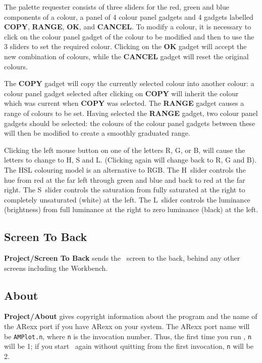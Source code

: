 The palette requester consists of three sliders for the red, green and blue 
components of a colour, a panel of 4 colour panel gadgets and 4 gadgets labelled 
{\bf COPY}, {\bf RANGE}, {\bf OK}, and {\bf CANCEL}. To modify a colour, it is 
necessary to click on 
the colour panel gadget of the colour to be modified and then to use the 3 sliders 
to set the required colour. Clicking on the {\bf OK} gadget will accept the new 
combination of colours, while the {\bf CANCEL} gadget will reset the original colours.

The {\bf COPY} gadget  will copy the currently selected colour into another colour: a 
colour panel gadget selected after clicking on {\bf COPY} will inherit the 
colour which was current when {\bf COPY} was selected. The {\bf RANGE} gadget 
causes a range of colours to be set. Having selected the {\bf RANGE} gadget, 
two colour panel gadgets should be 
selected: the colours of the colour panel gadgets between these will then be 
modified to create a smoothly graduated range.

Clicking the left mouse button on one of the letters R, G, or B, will cause the 
letters to change to H, S and L. (Clicking again will change back to R, G and B). 
The HSL colouring model is an alternative to RGB. The H~slider controls the hue from 
red at the far left through green and blue and back to red at the far right. The 
S~slider controls the saturation from fully saturated at the right to completely 
unsaturated (white) at the left. The L~slider controls the luminance (brightness) 
from full luminance at the right to zero luminance (black) at the left.

\subsection{Screen To Back}
{\bf Project/Screen To Back} sends the \amplot\ screen to the back, behind any other 
screens including the Workbench.

\subsection{About}
{\bf Project/About} gives copyright information about the program and the name of the 
ARexx port if you have ARexx on your system. The ARexx port name will 
be {\tt AMPlot.n}, where {\tt n} is the invocation number. Thus, the first time 
you run \amplot, {\tt n} will be 1; if you start \amplot\ again without quitting 
from the first invocation, {\tt n} will be 2.

